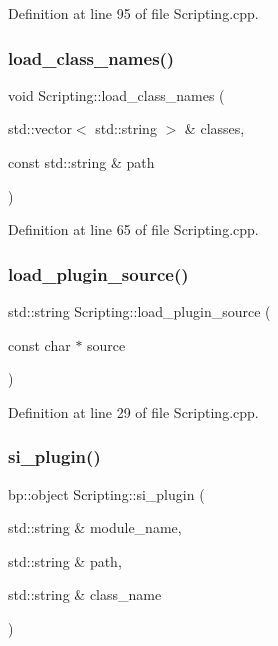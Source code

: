 Definition at line 95 of file Scripting.\+cpp.

\mbox{\label{class_scripting_a0e2761f442fbd7de97a0a90e0ea18678}} 
\subsubsection{\texorpdfstring{load\_class\_names()}{load\_class\_names()}}
{\footnotesize\ttfamily void Scripting\+::load\+\_\+class\+\_\+names (\begin{DoxyParamCaption}\item[{std\+::vector$<$ std\+::string $>$ \&}]{classes,  }\item[{const std\+::string \&}]{path }\end{DoxyParamCaption})}



Definition at line 65 of file Scripting.\+cpp.

\mbox{\label{class_scripting_ae9b5ef65b37ef02fd3bc6bb93890518b}} 
\subsubsection{\texorpdfstring{load\_plugin\_source()}{load\_plugin\_source()}}
{\footnotesize\ttfamily std\+::string Scripting\+::load\+\_\+plugin\+\_\+source (\begin{DoxyParamCaption}\item[{const char $\ast$}]{source }\end{DoxyParamCaption})}



Definition at line 29 of file Scripting.\+cpp.

\mbox{\label{class_scripting_a0c97745c04cb674f6ce2debfbf864579}} 
\subsubsection{\texorpdfstring{si\_plugin()}{si\_plugin()}}
{\footnotesize\ttfamily bp\+::object Scripting\+::si\+\_\+plugin (\begin{DoxyParamCaption}\item[{std\+::string \&}]{module\+\_\+name,  }\item[{std\+::string \&}]{path,  }\item[{std\+::string \&}]{class\+\_\+name }\end{DoxyParamCaption})}




